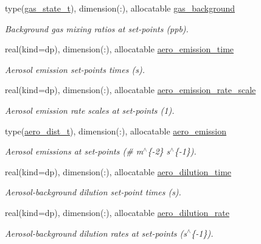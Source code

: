 \begin{DoxyCompactItemize}
type(\mbox{\hyperlink{structpmc__gas__state_1_1gas__state__t}{gas\+\_\+state\+\_\+t}}), dimension(\+:), allocatable \mbox{\hyperlink{structpmc__scenario_1_1scenario__t_ad527c2be03f89d66e701a3845cb50d1f}{gas\+\_\+background}}
\begin{DoxyCompactList}\small\item\em Background gas mixing ratios at set-\/points (ppb). \end{DoxyCompactList}\item 
real(kind=dp), dimension(\+:), allocatable \mbox{\hyperlink{structpmc__scenario_1_1scenario__t_af7c4b1a79fd8e4d65a8b95efaa63ce14}{aero\+\_\+emission\+\_\+time}}
\begin{DoxyCompactList}\small\item\em Aerosol emission set-\/points times (s). \end{DoxyCompactList}\item 
real(kind=dp), dimension(\+:), allocatable \mbox{\hyperlink{structpmc__scenario_1_1scenario__t_a7eba11dd31535de2e512696c01080f33}{aero\+\_\+emission\+\_\+rate\+\_\+scale}}
\begin{DoxyCompactList}\small\item\em Aerosol emission rate scales at set-\/points (1). \end{DoxyCompactList}\item 
type(\mbox{\hyperlink{structpmc__aero__dist_1_1aero__dist__t}{aero\+\_\+dist\+\_\+t}}), dimension(\+:), allocatable \mbox{\hyperlink{structpmc__scenario_1_1scenario__t_abba92de66da9633dd5bfe981893fa01f}{aero\+\_\+emission}}
\begin{DoxyCompactList}\small\item\em Aerosol emissions at set-\/points (\# m$^\wedge$\{-\/2\} s$^\wedge$\{-\/1\}). \end{DoxyCompactList}\item 
real(kind=dp), dimension(\+:), allocatable \mbox{\hyperlink{structpmc__scenario_1_1scenario__t_a89d22a74adbcf2a73838db8dd2c370c3}{aero\+\_\+dilution\+\_\+time}}
\begin{DoxyCompactList}\small\item\em Aerosol-\/background dilution set-\/point times (s). \end{DoxyCompactList}\item 
real(kind=dp), dimension(\+:), allocatable \mbox{\hyperlink{structpmc__scenario_1_1scenario__t_a07fe2dc1bd1215ef637b06741358e744}{aero\+\_\+dilution\+\_\+rate}}
\begin{DoxyCompactList}\small\item\em Aerosol-\/background dilution rates at set-\/points (s$^\wedge$\{-\/1\}). \end{DoxyCompactList}\item 

\end{DoxyCompactItemize}
